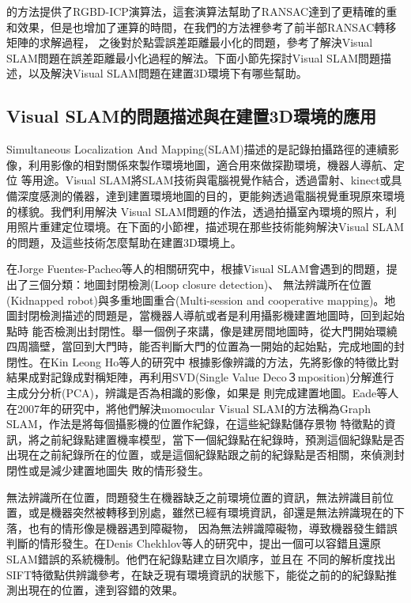 	\cite{Henry2012}的方法提供了RGBD-ICP演算法，這套演算法幫助了RANSAC達到了更精確的重和效果，但是也增加了運算的時間，在我們的方法裡參考了前半部RANSAC轉移矩陣的求解過程，
之後對於點雲誤差距離最小化的問題，參考了解決Visual SLAM問題在誤差距離最小化過程的解法。下面小節先探討Visual SLAM問題描述，以及解決Visual SLAM問題在建置3D環境下有哪些幫助。
	
\subsection{Visual SLAM的問題描述與在建置3D環境的應用}

	Simultaneous Localization And Mapping(SLAM)描述的是記錄拍攝路徑的連續影像，利用影像的相對關係來製作環境地圖，適合用來做探勘環境，機器人導航、定位
等用途。Visual SLAM將SLAM技術與電腦視覺作結合，透過雷射、kinect或具備深度感測的儀器，達到建置環境地圖的目的，更能夠透過電腦視覺重現原來環境的樣貌。我們利用解決
Visual SLAM問題的作法，透過拍攝室內環境的照片，利用照片重建定位環境。在下面的小節裡，描述現在那些技術能夠解決Visual SLAM的問題，及這些技術怎麼幫助在建置3D環境上。

	在Jorge Fuentes-Pacheo等人的相關研究\cite{Fuentes-Pacheco2012}中，根據Visual SLAM會遇到的問題，提出了三個分類：地圖封閉檢測(Loop closure detection)、
無法辨識所在位置(Kidnapped robot)與多重地圖重合(Multi-session and cooperative mapping)。地圖封閉檢測描述的問題是，當機器人導航或者是利用攝影機建置地圖時，回到起始點時
能否檢測出封閉性。舉一個例子來講，像是建房間地圖時，從大門開始環繞四周牆壁，當回到大門時，能否判斷大門的位置為一開始的起始點，完成地圖的封閉性。在Kin Leong Ho等人的研究中
\cite{Ho2007}根據影像辨識的方法，先將影像的特徵比對結果成對記錄成對稱矩陣，再利用SVD(Single Value Deco３mposition)分解進行主成分分析(PCA)，辨識是否為相識的影像，如果是
則完成建置地圖。Eade等人在2007年的研究中\cite{Eade2007}，將他們解決momocular Visual SLAM的方法稱為Graph SLAM，作法是將每個攝影機的位置作紀錄，在這些紀錄點儲存景物
特徵點的資訊，將之前紀錄點建置機率模型，當下一個紀錄點在紀錄時，預測這個紀錄點是否出現在之前紀錄所在的位置，或是這個紀錄點跟之前的紀錄點是否相關，來偵測封閉性或是減少建置地圖失
敗的情形發生。

	無法辨識所在位置，問題發生在機器缺乏之前環境位置的資訊，無法辨識目前位置，或是機器突然被轉移到別處，雖然已經有環境資訊，卻還是無法辨識現在的下落，也有的情形像是機器遇到障礙物，
因為無法辨識障礙物，導致機器發生錯誤判斷的情形發生。在Denis Chekhlov等人的研究中\cite{Chekhlov2008}，提出一個可以容錯且還原SLAM錯誤的系統機制。他們在紀錄點建立目次順序，並且在
不同的解析度找出SIFT特徵點供辨識參考，在缺乏現有環境資訊的狀態下，能從之前的的紀錄點推測出現在的位置，達到容錯的效果。

